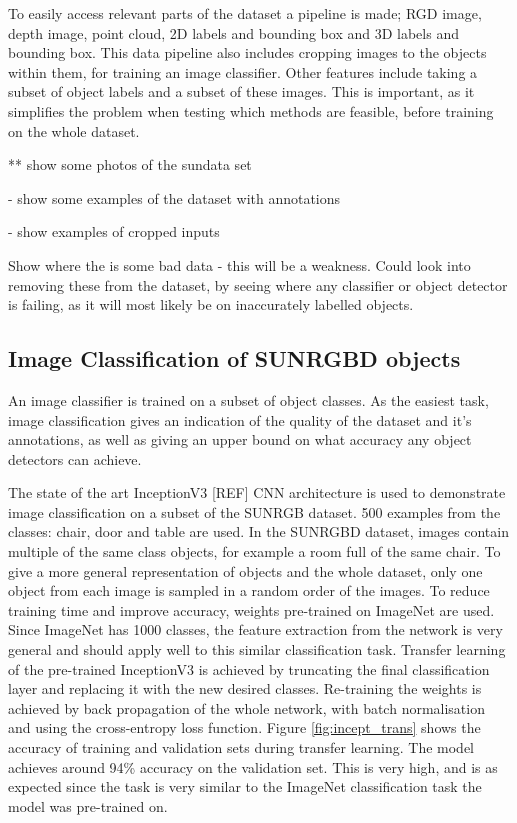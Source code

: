 \documentclass[11pt]{article}
\begin{document}
To easily access relevant parts of the dataset a pipeline is made; RGD image, depth image, point cloud, 2D labels and bounding box and 3D labels and bounding box. This data pipeline also includes cropping images to the objects within them, for training an image classifier. Other features include taking a subset of object labels and a subset of these images. This is important, as it simplifies the problem when testing which methods are feasible, before training on the whole dataset.

** show some photos of the sundata set

- show some examples of the dataset with annotations

- show examples of cropped inputs

Show where the is some bad data -  this will be a weakness. Could look into removing these from the dataset, by seeing where any classifier or object detector is failing, as it will most likely be on inaccurately labelled objects.

\subsection*{Image Classification of SUNRGBD objects}
An image classifier is trained on a subset of object classes. As the easiest task, image classification gives an indication of the quality of the dataset and it's annotations, as well as giving an upper bound on what accuracy any object detectors can achieve.

The state of the art InceptionV3 [REF] CNN architecture is used to demonstrate image classification on a subset of the SUNRGB dataset. 500 examples from the classes: chair, door and table are used. In the SUNRGBD dataset, images contain multiple of the same class objects, for example a room full of the same chair. To give a more general representation of objects and the whole dataset, only one object from each image is sampled in a random order of the images. To reduce training time and improve accuracy, weights pre-trained on ImageNet are used. Since ImageNet has 1000 classes, the feature extraction from the network is very general and should apply well to this similar classification task. Transfer learning of the pre-trained InceptionV3 is achieved by truncating the final classification layer and replacing it with the new desired classes. Re-training the weights is achieved by back propagation of the whole network, with batch normalisation and using the cross-entropy loss function. Figure \ref{fig:incept_trans} shows the accuracy of training and validation sets during transfer learning. The model achieves around 94\% accuracy on the validation set. This is very high, and is as expected since the task is very similar to the ImageNet classification task the model was pre-trained on.
\end{document}
